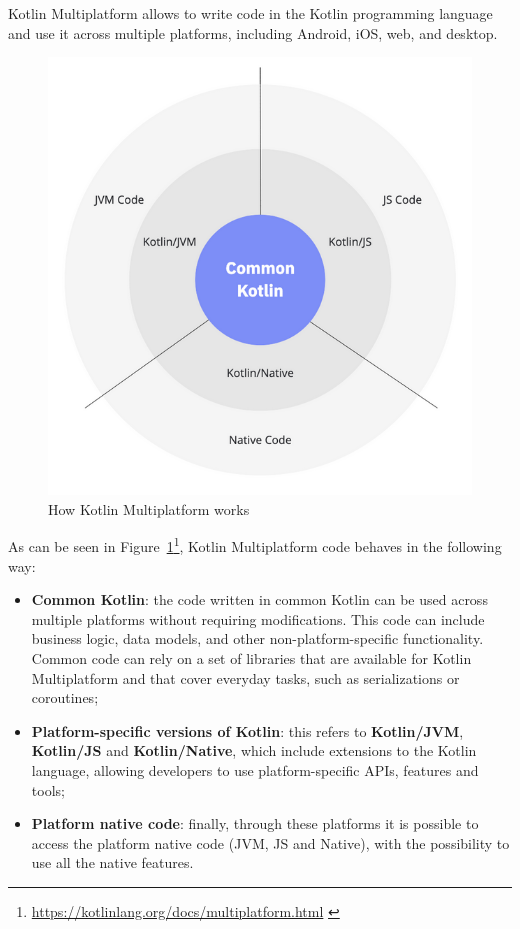 Kotlin Multiplatform allows to write code in the Kotlin programming language and use it across multiple platforms, including Android, iOS, web, and desktop.
\begin{figure}[!ht]
    \centering
    \includegraphics[scale=0.9]{document/chapters/4-collektive/images/kotlin_multiplatform_code.png}
    \caption{How Kotlin Multiplatform works}
    \label{fig:km_code_work}
\end{figure}
As can be seen in Figure~\ref{fig:km_code_work}\footnote{\url{https://kotlinlang.org/docs/multiplatform.html} \label{km_footnote}}, Kotlin Multiplatform code behaves in the following way:
\begin{itemize}
    \item \textbf{Common Kotlin}: the code written in common Kotlin can be used across multiple platforms without requiring modifications. This code can include business logic, data models, and other non-platform-specific functionality. Common code can rely on a set of libraries that are available for Kotlin Multiplatform and that cover everyday tasks, such as serializations or coroutines;
    \item \textbf{Platform-specific versions of Kotlin}: this refers to \textbf{Kotlin/JVM}, \textbf{Kotlin/JS} and \textbf{Kotlin/Native}, which include extensions to the Kotlin language, allowing developers to use platform-specific APIs, features and tools;
    \item \textbf{Platform native code}: finally, through these platforms it is possible to access the platform native code (JVM, JS and Native), with the possibility to use all the native features.
\end{itemize}


